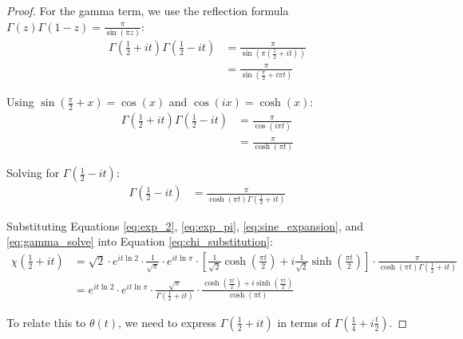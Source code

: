 \documentclass{article}
\begin{document}
\begin{proof}
For the gamma term, we use the reflection formula $\Gamma(z)\Gamma(1-z) = \frac{\pi}{\sin(\pi z)}$:
\begin{align}
\Gamma\left(\frac{1}{2}+it\right)\Gamma\left(\frac{1}{2}-it\right) &= \frac{\pi}{\sin\left(\pi\left(\frac{1}{2}+it\right)\right)} \label{eq:gamma_reflection}\\
&= \frac{\pi}{\sin\left(\frac{\pi}{2}+i\pi t\right)} \label{eq:gamma_reflection_applied}
\end{align}

Using $\sin\left(\frac{\pi}{2}+x\right) = \cos(x)$ and $\cos(ix) = \cosh(x)$:
\begin{align}
\Gamma\left(\frac{1}{2}+it\right)\Gamma\left(\frac{1}{2}-it\right) &= \frac{\pi}{\cos(i\pi t)} \label{eq:gamma_cos}\\
&= \frac{\pi}{\cosh(\pi t)} \label{eq:gamma_cosh}
\end{align}

Solving for $\Gamma\left(\frac{1}{2}-it\right)$:
\begin{align}\label{eq:gamma_solve}
\Gamma\left(\frac{1}{2}-it\right) &= \frac{\pi}{\cosh(\pi t)\Gamma\left(\frac{1}{2}+it\right)}
\end{align}

Substituting Equations \eqref{eq:exp_2}, \eqref{eq:exp_pi}, \eqref{eq:sine_expansion}, and \eqref{eq:gamma_solve} into Equation \eqref{eq:chi_substitution}:
\begin{align}
\chi\left(\frac{1}{2}+it\right) &= \sqrt{2} \cdot e^{it\ln 2} \cdot \frac{1}{\sqrt{\pi}} \cdot e^{it\ln\pi} \cdot \left[\frac{1}{\sqrt{2}}\cosh\left(\frac{\pi t}{2}\right) + i\frac{1}{\sqrt{2}}\sinh\left(\frac{\pi t}{2}\right)\right] \cdot \frac{\pi}{\cosh(\pi t)\Gamma\left(\frac{1}{2}+it\right)} \label{eq:chi_expanded}\\
&= e^{it\ln 2} \cdot e^{it\ln\pi} \cdot \frac{\sqrt{\pi}}{\Gamma\left(\frac{1}{2}+it\right)} \cdot \frac{\cosh\left(\frac{\pi t}{2}\right) + i\sinh\left(\frac{\pi t}{2}\right)}{\cosh(\pi t)} \label{eq:chi_simplified}
\end{align}

To relate this to $\theta(t)$, we need to express $\Gamma\left(\frac{1}{2}+it\right)$ in terms of $\Gamma\left(\frac{1}{4}+i\frac{t}{2}\right)$.


\end{proof}
\end{document}
